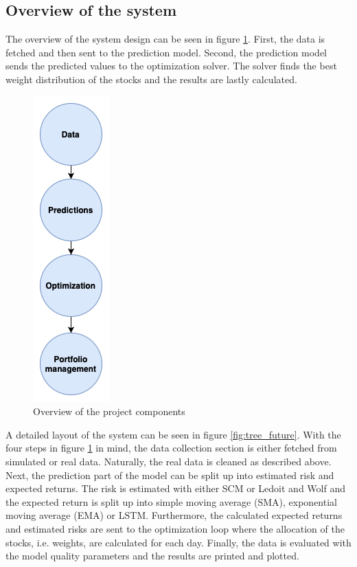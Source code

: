 \documentclass[final]{LTHtwocol} %
\begin{document}
\subsection{Overview of the system}
The overview of the system design can be seen in figure \ref{fig:overview}. First, the data is fetched and then sent to the prediction model. Second, the prediction model sends the predicted values to the optimization solver. The solver finds  the best weight distribution of the stocks and the results are lastly calculated.

\begin{figure}[h]
	\centering
	\includegraphics[width=0.2\columnwidth]{Pics/Overview_tree.png}
	\caption{Overview of the project components}
	\label{fig:overview} %
\end{figure}

A detailed layout of the system can be seen in figure \ref{fig:tree_future}. With the four steps in figure \ref{fig:overview} in mind, the data collection section is either fetched from simulated or real data. Naturally, the real data is cleaned as described above. Next, the prediction part of the model can be split up into estimated risk and expected returns. The risk is estimated with either SCM or Ledoit and Wolf and the expected return is split up into simple moving average (SMA), exponential moving average (EMA) or LSTM. Furthermore, the calculated expected returns and estimated risks are sent to the optimization loop where the allocation of the stocks, i.e. weights, are calculated for each day. Finally, the data is evaluated with the model quality parameters and the results are printed and plotted.
\end{document}
